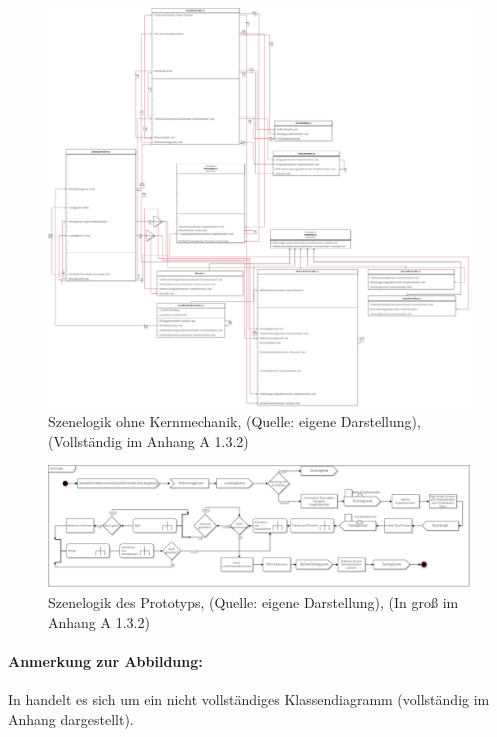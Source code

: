 \begin{figure}[ht]
\centering
\includegraphics[width=1\linewidth]{content/pictures/Level_loop_upto_character_creation.jpg}
\caption{Szenelogik ohne Kernmechanik, (Quelle: eigene Darstellung), (Vollständig im Anhang A 1.3.2)}
\label{fig:level_game_loop_class_connectors}
\end{figure}



\begin{figure}[ht]
\centering
\includegraphics[width=1\linewidth]{content/pictures/level-loop_prototype.jpg}
\caption{Szenelogik des Prototyps, (Quelle: eigene Darstellung), (In groß im Anhang A 1.3.2)}
\label{fig:level_loop_prototype}
\end{figure}
\paragraph{Anmerkung zur Abbildung:}
In  handelt es sich um ein nicht vollständiges Klassendiagramm (vollständig im Anhang dargestellt).

